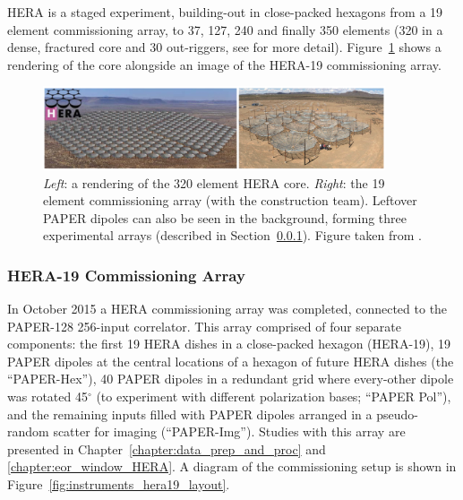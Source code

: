 HERA is a staged experiment, building-out in close-packed hexagons from a 19 element commissioning array, to 37, 127, 240 and finally 350 elements (320 in a dense, fractured core and 30 out-riggers, see \citealt{Dillon.16} for more detail). Figure~\ref{fig:instruments_hera_layout} shows a rendering of the core alongside an image of the HERA-19 commissioning array.

\begin{figure}
\centering
\includegraphics[width=0.9\textwidth]{chapters/instruments/figures/HERAlayout_deBoer.png}
\caption[Future vision and physical commissioning HERA layout.]{\textit{Left}: a rendering of the 320 element HERA core. \textit{Right}: the 19 element commissioning array (with the construction team). Leftover PAPER dipoles can also be seen in the background, forming three experimental arrays (described in Section~\ref{subsubsec:instruments_hera19}). Figure taken from \cite{deBoer.17}.}
\label{fig:instruments_hera_layout}
\end{figure}

\subsubsection{HERA-19 Commissioning Array}
\label{subsubsec:instruments_hera19}

In October 2015 a HERA commissioning array was completed, connected to the PAPER-128 256-input correlator. This array comprised of four separate components: the first 19 HERA dishes in a close-packed hexagon (HERA-19), 19 PAPER dipoles at the central locations of a hexagon of future HERA dishes (the ``PAPER-Hex''), 40 PAPER dipoles in a redundant grid where every-other dipole was rotated 45$^{\circ}$ (to experiment with different polarization bases; ``PAPER Pol''), and the remaining inputs filled with PAPER dipoles arranged in a pseudo-random scatter for imaging (``PAPER-Img''). Studies with this array are presented in Chapter~\ref{chapter:data_prep_and_proc} and \ref{chapter:eor_window_HERA}. A diagram of the commissioning setup is shown in Figure~\ref{fig:instruments_hera19_layout}.

